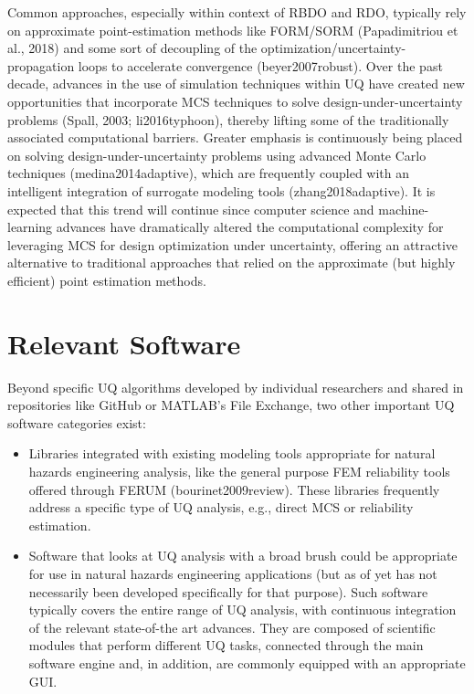 Common approaches, especially within context of RBDO and RDO, typically rely on approximate point-estimation methods like FORM/SORM (Papadimitriou et al., 2018) and some sort of decoupling of the optimization/uncertainty-propagation loops to accelerate convergence (beyer2007robust). Over the past decade, advances in the use of simulation techniques within UQ have created new opportunities that incorporate MCS techniques to solve design-under-uncertainty problems (Spall, 2003; li2016typhoon), thereby lifting some of the traditionally associated computational barriers. Greater emphasis is continuously being placed on solving design-under-uncertainty problems using advanced Monte Carlo techniques (medina2014adaptive), which are frequently coupled with an intelligent integration of surrogate modeling tools (zhang2018adaptive). It is expected that this trend will continue since computer science and machine-learning advances have dramatically altered the computational complexity for leveraging MCS for design optimization under uncertainty, offering an attractive alternative to traditional approaches that relied on the approximate (but highly efficient) point estimation methods. 

\section{Relevant Software}
\label{sec:uq_tools}

Beyond specific UQ algorithms developed by individual researchers and shared in repositories like GitHub or MATLAB’s File Exchange, two other important UQ software categories exist:

\begin{itemize}
    \item Libraries integrated with existing modeling tools appropriate for natural hazards engineering analysis, like the general purpose FEM reliability tools offered through FERUM (bourinet2009review). These libraries frequently address a specific type of UQ analysis, e.g., direct MCS or reliability estimation.
    \item Software that looks at UQ analysis with a broad brush could be appropriate for use in natural hazards engineering applications (but as of yet has not necessarily been developed specifically for that purpose). Such software typically covers the entire range of UQ analysis, with continuous integration of the relevant state-of-the art advances. They are composed of scientific modules that perform different UQ tasks, connected through the main software engine and, in addition, are commonly equipped with an appropriate GUI. 
\end{itemize}
	
